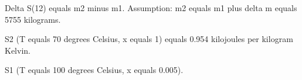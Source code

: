 Delta S(12) equals m2 minus m1.  
Assumption:  
m2 equals m1 plus delta m equals 5755 kilograms.  

S2 (T equals 70 degrees Celsius, x equals 1) equals 0.954 kilojoules per kilogram Kelvin.  

S1 (T equals 100 degrees Celsius, x equals 0.005).